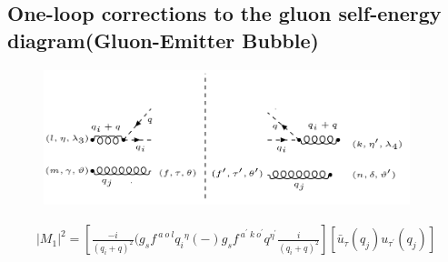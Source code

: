 \pagebreak
%

\pagebreak
\subsection{One-loop corrections to the gluon self-energy diagram(Gluon-Emitter Bubble)}
\begin{figure}[h!]
\centering
\includegraphics[width=0.95\textwidth]{images/GG/Ghost.png}
\end{figure}

\begin{equation}
\begin{split}
|M_1|^2=[ \frac{-i}{(q_i +q)^2}(g_s f^{\:a\:o\:l} {q_i}^{\eta} (-) g_s f^{\:a^{\prime}\:k\:o^{\prime}} {q}^{{\eta}^{\prime}}\frac{i}{(q_i +q)^2}][\bar{u}_{\tau}(q_j){u}_{{\tau}^{\prime}}(q_j)]
\end{split}
\end{equation}

